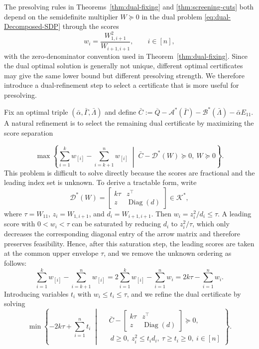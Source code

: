 \documentclass[11pt]{article}
\DeclareMathOperator{\Diag}{Diag}
\def\D{\mathcal{D}}
\def\A{\mathcal{A}}
\def\B{\mathcal{B}}
\def\K{\mathcal{K}}
\def\bQ{\overline{Q}}
\theoremstyle{plain}
\begin{document}
The presolving rules in Theorems~\ref{thm:dual-fixing} and \ref{thm:screening-cuts} both depend on the semidefinite multiplier $W\succeq0$ in the dual problem \eqref{eq:dual-Decomposed-SDP} through the scores
\[
w_i=\frac{W_{1,i+1}^2}{W_{i+1,i+1}},\qquad i\in[n],
\]
with the zero-denominator convention used in Theorem~\ref{thm:dual-fixing}. Since the dual optimal solution is generally not unique, different optimal certificates may give the same lower bound but different presolving strength. We therefore introduce a dual-refinement step to select a certificate that is more useful for presolving.

Fix an optimal triple $(\bar\alpha,\bar\Gamma,\bar\Lambda)$ and define $\bar C:=\bQ-\A^*(\bar\Gamma)-\B^*(\bar\Lambda)-\bar\alpha E_{11}$. A natural refinement is to select the remaining dual certificate by maximizing the score separation

\begin{equation}
\label{eq:dual-refinement-ideal}
\max\left\{
\sum_{i=1}^k w_{[i]}-\sum_{i=k+1}^n w_{[i]}
\;\middle|\;
\bar C-\D^*(W)\succeq0,\ W\succeq0
\right\}.
\end{equation}
This problem is difficult to solve directly because the scores are fractional and the leading index set is unknown. To derive a tractable form, write
\[
\D^*(W)=
\begin{bmatrix}
k\tau & z^\top\\
z & \Diag(d)
\end{bmatrix}\in\K^*,
\]
where $\tau=W_{11}$, $z_i=W_{1,i+1}$, and $d_i=W_{i+1,i+1}$. Then $w_i=z_i^2/d_i\le\tau$. A leading score with $0<w_i<\tau$ can be saturated by reducing $d_i$ to $z_i^2/\tau$, which only decreases the corresponding diagonal entry of the arrow matrix and therefore preserves feasibility. Hence, after this saturation step, the leading scores are taken at the common upper envelope $\tau$, and we remove the unknown ordering as follows: 
\begin{equation*}
\sum_{i=1}^k w_{[i]}-\sum_{i=k+1}^n w_{[i]}
=2\sum_{i=1}^k w_{[i]}-\sum_{i=1}^n w_i
=2k\tau-\sum_{i=1}^n w_i .
\end{equation*}
Introducing variables $t_i$ with $w_i\le t_i\le\tau$, and we refine the dual certificate by solving
\begin{equation}
\label{eq:dual-refinement-uqp}
\min\left\{-2k\tau + \sum_{i=1}^n t_i
\;\middle|\;
\begin{aligned}
&\bar C-
\begin{bmatrix}
k\tau & z^\top\\
z & \Diag(d)
\end{bmatrix}
\succeq 0,\\
&\ d\ge 0,\ z_i^2\le t_i d_i,\ \tau \geq t_i \ge 0,\ i\in[n]
\end{aligned}
\right\}.
\end{equation}
\begingroup
\makeatletter
\def\@currentlabel{\theequation}
\label{eq:dual-refinement-uqp-reduced}
\makeatother
\endgroup
\end{document}
